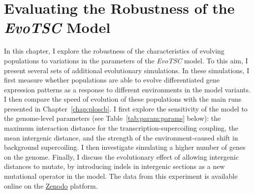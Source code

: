 \chapter{Evaluating the Robustness of the \emph{EvoTSC} Model}
\label{chap:param}

In this chapter, I explore the robustness of the characteristics of evolving populations to variations in the parameters of the \emph{EvoTSC} model.
To this aim, I present several sets of additional evolutionary simulations.
In these simulations, I first measure whether populations are able to evolve differentiated gene expression patterns as a response to different environments in the model variants.
I then compare the speed of evolution of these populations with the main runs presented in Chapter~\ref{chap:ploscb}.
I first explore the sensitivity of the model to the genome-level parameters (see Table~\ref{tab:param:params} below): the maximum interaction distance for the transcription-supercoiling coupling, the mean intergenic distance, and the strength of the environment-caused shift in background supercoiling.
I then investigate simulating a higher number of genes on the genome.
Finally, I discuss the evolutionary effect of allowing intergenic distances to mutate, by introducing indels in intergenic sections as a new mutational operator in the model.
The data from this experiment is available online on the \href{https://doi.org/10.5281/zenodo.7304906}{Zenodo} platform.

